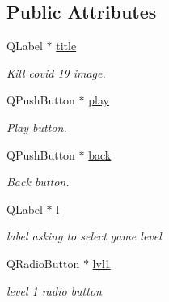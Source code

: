 \subsection*{Public Attributes}
\begin{DoxyCompactItemize}
\item 
\mbox{\label{classgame1menu_a72289ac8053ed3830cf9ea1e6655ca2c}} 
Q\+Label $\ast$ \hyperlink{classgame1menu_a72289ac8053ed3830cf9ea1e6655ca2c}{title}
\begin{DoxyCompactList}\small\item\em Kill covid 19 image. \end{DoxyCompactList}\item 
\mbox{\label{classgame1menu_aeee4023ded9672b32063b53fbe63bdea}} 
Q\+Push\+Button $\ast$ \hyperlink{classgame1menu_aeee4023ded9672b32063b53fbe63bdea}{play}
\begin{DoxyCompactList}\small\item\em Play button. \end{DoxyCompactList}\item 
\mbox{\label{classgame1menu_a83a7c9efd9a7b4511376586768b8bcd9}} 
Q\+Push\+Button $\ast$ \hyperlink{classgame1menu_a83a7c9efd9a7b4511376586768b8bcd9}{back}
\begin{DoxyCompactList}\small\item\em Back button. \end{DoxyCompactList}\item 
\mbox{\label{classgame1menu_ac95cf576945f0bb06767e31377c9e63c}} 
Q\+Label $\ast$ \hyperlink{classgame1menu_ac95cf576945f0bb06767e31377c9e63c}{l}
\begin{DoxyCompactList}\small\item\em label asking to select game level \end{DoxyCompactList}\item 
\mbox{\label{classgame1menu_aab51ae6d3c40e2fea3e6e337a093ff0f}} 
Q\+Radio\+Button $\ast$ \hyperlink{classgame1menu_aab51ae6d3c40e2fea3e6e337a093ff0f}{lvl1}
\begin{DoxyCompactList}\small\item\em level 1 radio button \end{DoxyCompactList}\item 

\end{DoxyCompactItemize}
